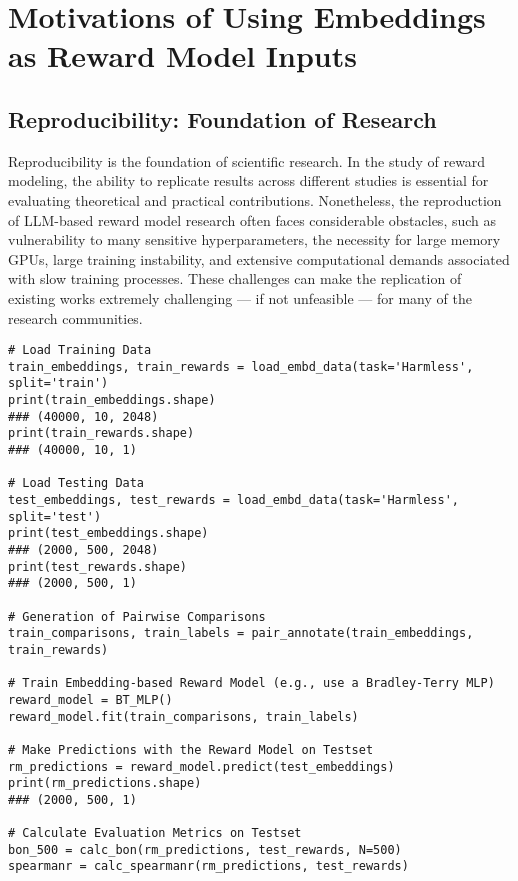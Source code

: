 \section{Motivations of Using Embeddings as Reward Model Inputs}
\label{sec:motivations}
\subsection{Reproducibility: Foundation of Research}
\label{sec:cheap_train}
Reproducibility is the foundation of scientific research. In the study of reward modeling, the ability to replicate results across different studies is essential for evaluating theoretical and practical contributions. Nonetheless, the reproduction of LLM-based reward model research often faces considerable obstacles, such as vulnerability to many sensitive hyperparameters, the necessity for large memory GPUs, large training instability, and extensive computational demands associated with slow training processes. These challenges can make the replication of existing works extremely challenging --- if not unfeasible --- for many of the research communities.


\begin{table*}[h!]
\begin{lstlisting}
# Load Training Data
train_embeddings, train_rewards = load_embd_data(task='Harmless', split='train')
print(train_embeddings.shape) 
### (40000, 10, 2048)
print(train_rewards.shape) 
### (40000, 10, 1)

# Load Testing Data
test_embeddings, test_rewards = load_embd_data(task='Harmless', split='test')
print(test_embeddings.shape) 
### (2000, 500, 2048)
print(test_rewards.shape) 
### (2000, 500, 1)

# Generation of Pairwise Comparisons
train_comparisons, train_labels = pair_annotate(train_embeddings, train_rewards)

# Train Embedding-based Reward Model (e.g., use a Bradley-Terry MLP)
reward_model = BT_MLP()
reward_model.fit(train_comparisons, train_labels)

# Make Predictions with the Reward Model on Testset
rm_predictions = reward_model.predict(test_embeddings)
print(rm_predictions.shape) 
### (2000, 500, 1)

# Calculate Evaluation Metrics on Testset
bon_500 = calc_bon(rm_predictions, test_rewards, N=500)
spearmanr = calc_spearmanr(rm_predictions, test_rewards)
\end{lstlisting}
\label{algo}\vspace{-0.4cm}
\end{table*}

